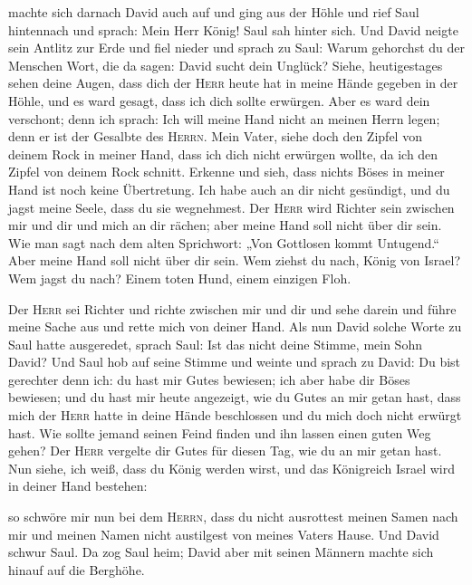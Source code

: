  machte sich darnach David auch auf und ging aus der Höhle
und rief Saul hintennach und sprach: Mein Herr König! Saul sah hinter
sich. Und David neigte sein Antlitz zur Erde und fiel nieder
 und sprach zu Saul: Warum gehorchst du der Menschen
Wort, die da sagen: David sucht dein Unglück?  Siehe,
heutigestages sehen deine Augen, dass dich der \textsc{Herr} heute hat
in meine Hände gegeben in der Höhle, und es ward gesagt, dass ich dich
sollte erwürgen. Aber es ward dein verschont; denn ich sprach: Ich will
meine Hand nicht an meinen Herrn legen; denn er ist der Gesalbte des
\textsc{Herrn}.  Mein Vater, siehe doch den Zipfel von
deinem Rock in meiner Hand, dass ich dich nicht erwürgen wollte, da ich
den Zipfel von deinem Rock schnitt. Erkenne und sieh, dass nichts Böses
in meiner Hand ist noch keine Übertretung. Ich habe auch an dir nicht
gesündigt, und du jagst meine Seele, dass du sie wegnehmest.
 Der \textsc{Herr} wird Richter sein zwischen mir und dir
und mich an dir rächen; aber meine Hand soll nicht über dir sein.
 Wie man sagt nach dem alten Sprichwort: „Von Gottlosen
kommt Untugend.`` Aber meine Hand soll nicht über dir sein.
 Wem ziehst du nach, König von Israel? Wem jagst du nach?
Einem toten Hund, einem einzigen Floh.

 Der \textsc{Herr} sei Richter und richte zwischen mir
und dir und sehe darein und führe meine Sache aus und rette mich von
deiner Hand.  Als nun David solche Worte zu Saul hatte
ausgeredet, sprach Saul: Ist das nicht deine Stimme, mein Sohn David?
Und Saul hob auf seine Stimme und weinte  und sprach zu
David: Du bist gerechter denn ich: du hast mir Gutes bewiesen; ich aber
habe dir Böses bewiesen;  und du hast mir heute
angezeigt, wie du Gutes an mir getan hast, dass mich der \textsc{Herr}
hatte in deine Hände beschlossen und du mich doch nicht erwürgt hast.
 Wie sollte jemand seinen Feind finden und ihn lassen
einen guten Weg gehen? Der \textsc{Herr} vergelte dir Gutes für diesen
Tag, wie du an mir getan hast.  Nun siehe, ich weiß, dass
du König werden wirst, und das Königreich Israel wird in deiner Hand
bestehen:

 so schwöre mir nun bei dem \textsc{Herrn}, dass du nicht
ausrottest meinen Samen nach mir und meinen Namen nicht austilgest von
meines Vaters Hause.  Und David schwur Saul. Da zog Saul
heim; David aber mit seinen Männern machte sich hinauf auf die Berghöhe.

